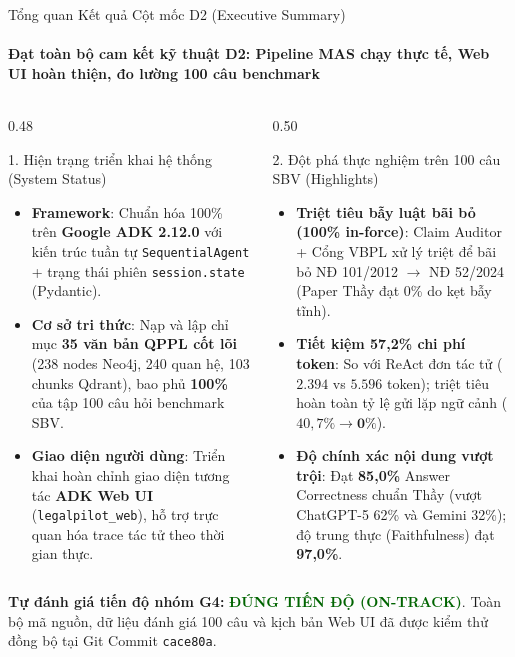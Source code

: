 \documentclass[aspectratio=169,10pt,xcolor={table}]{beamer}
\begin{document}
\begin{frame}{Tổng quan Kết quả Cột mốc D2 (Executive Summary)}
\framesubtitle{Đạt toàn bộ cam kết kỹ thuật D2: Pipeline MAS chạy thực tế, Web UI hoàn thiện, đo lường 100 câu benchmark}
\begin{columns}[T]
\begin{column}{0.48\textwidth}
\begin{block}{\small 1. Hiện trạng triển khai hệ thống (System Status)}
\footnotesize
\begin{itemize}
  \item \textbf{Framework}: Chuẩn hóa 100\% trên \textbf{Google ADK 2.12.0} với kiến trúc tuần tự \texttt{SequentialAgent} + trạng thái phiên \texttt{session.state} (Pydantic).
  \item \textbf{Cơ sở tri thức}: Nạp và lập chỉ mục \textbf{35 văn bản QPPL cốt lõi} (238 nodes Neo4j, 240 quan hệ, 103 chunks Qdrant), bao phủ \textbf{100\%} của tập 100 câu hỏi benchmark SBV.
  \item \textbf{Giao diện người dùng}: Triển khai hoàn chỉnh giao diện tương tác \textbf{ADK Web UI} (\texttt{legalpilot\_web}), hỗ trợ trực quan hóa trace tác tử theo thời gian thực.
\end{itemize}
\end{block}
\end{column}

\begin{column}{0.50\textwidth}
\begin{block}{\small 2. Đột phá thực nghiệm trên 100 câu SBV (Highlights)}
\footnotesize
\begin{itemize}
  \item \textbf{Triệt tiêu bẫy luật bãi bỏ (100\% in-force)}: Claim Auditor + Cổng VBPL xử lý triệt để bãi bỏ NĐ 101/2012 $\to$ NĐ 52/2024 (Paper Thầy đạt 0\% do kẹt bẫy tĩnh).
  \item \textbf{Tiết kiệm 57,2\% chi phí token}: So với ReAct đơn tác tử ($2.394$ vs $5.596$ token); triệt tiêu hoàn toàn tỷ lệ gửi lặp ngữ cảnh ($40,7\% \to \mathbf{0\%}$).
  \item \textbf{Độ chính xác nội dung vượt trội}: Đạt \textbf{85,0\%} Answer Correctness chuẩn Thầy (vượt ChatGPT-5 62\% và Gemini 32\%); độ trung thực (Faithfulness) đạt \textbf{97,0\%}.
\end{itemize}
\end{block}
\end{column}
\end{columns}
\vskip0.15cm
\begin{tcolorbox}[colback=hcmutblue!10,colframe=hcmutblue,boxrule=0.6pt,top=2pt,bottom=2pt,left=4pt,right=4pt]
\scriptsize\textbf{Tự đánh giá tiến độ nhóm G4:} \textcolor{darkgreen}{\textbf{ĐÚNG TIẾN ĐỘ (ON-TRACK)}}. Toàn bộ mã nguồn, dữ liệu đánh giá 100 câu và kịch bản Web UI đã được kiểm thử đồng bộ tại Git Commit \texttt{cace80a}.
\end{tcolorbox}
\end{frame}
\end{document}
